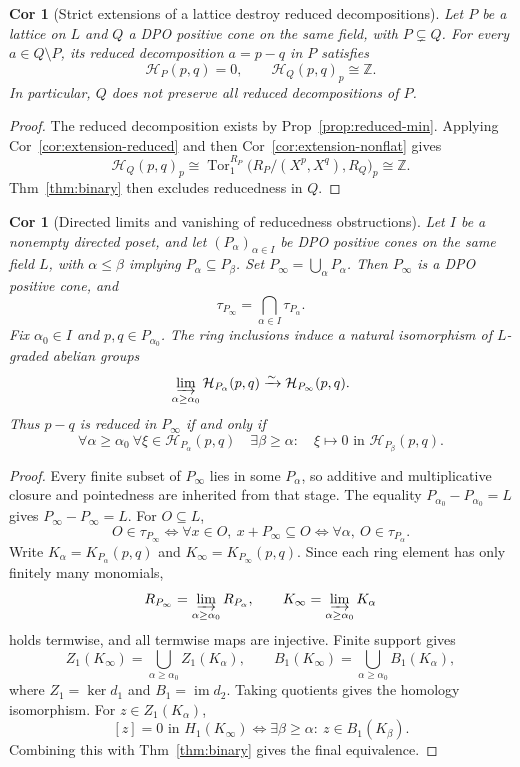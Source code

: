 \documentclass[10pt,letterpaper]{amsart}
\numberwithin{equation}{section}
\newtheorem{cor}[thm]{Cor}
\theoremstyle{definition}
\newcommand{\Z}{\mathbb Z}
\newcommand{\Tor}{\operatorname{Tor}}
\newcommand{\HH}{\mathcal H}
\begin{document}
\begin{cor}[Strict extensions of a lattice destroy reduced decompositions]\label{cor:lattice-extension}
Let $P$ be a lattice on $L$ and $Q$ a DPO positive cone on the same field, with $P\subsetneq Q$.
For every $a\in Q\setminus P$, its reduced decomposition $a=p-q$ in $P$ satisfies
\[
\HH_P(p,q)=0,\qquad\HH_Q(p,q)_p\cong\Z.
\]
In particular, $Q$ does not preserve all reduced decompositions of $P$.
\end{cor}
\begin{proof}
The reduced decomposition exists by Prop~\ref{prop:reduced-min}.
Applying Cor~\ref{cor:extension-reduced} and then Cor~\ref{cor:extension-nonflat} gives
\[
\HH_Q(p,q)_p
\cong\Tor_1^{R_P}\bigl(R_P/(X^p,X^q),R_Q\bigr)_p
\cong\Z.
\]
Thm~\ref{thm:binary} then excludes reducedness in $Q$.
\end{proof}

\begin{cor}[Directed limits and vanishing of reducedness obstructions]\label{cor:cone-limit}
Let $I$ be a nonempty directed poset, and let $(P_\alpha)_{\alpha\in I}$ be DPO positive cones on the same field $L$, with $\alpha\le\beta$ implying $P_\alpha\subseteq P_\beta$. Set $P_\infty=\bigcup_\alpha P_\alpha$. Then $P_\infty$ is a DPO positive cone, and
\[
\tau_{P_\infty}=\bigcap_{\alpha\in I}\tau_{P_\alpha}.
\]
Fix $\alpha_0\in I$ and $p,q\in P_{\alpha_0}$. The ring inclusions induce a natural isomorphism of $L$-graded abelian groups
\[
\varinjlim_{\alpha\ge\alpha_0}\HH_{P_\alpha}(p,q)
\xrightarrow{\sim}\HH_{P_\infty}(p,q).
\]
Thus $p-q$ is reduced in $P_\infty$ if and only if
\[
\forall\alpha\ge\alpha_0\ \forall\xi\in\HH_{P_\alpha}(p,q)\quad
\exists\beta\ge\alpha:\quad
\xi\longmapsto0\text{ in }\HH_{P_\beta}(p,q).
\]
\end{cor}
\begin{proof}
Every finite subset of $P_\infty$ lies in some $P_\alpha$, so additive and multiplicative closure and pointedness are inherited from that stage. The equality $P_{\alpha_0}-P_{\alpha_0}=L$ gives $P_\infty-P_\infty=L$.
For $O\subseteq L$,
\[
O\in\tau_{P_\infty}
\iff\forall x\in O,\ x+P_\infty\subseteq O
\iff\forall\alpha,\ O\in\tau_{P_\alpha}.
\]
Write $K_\alpha=K_{P_\alpha}(p,q)$ and $K_\infty=K_{P_\infty}(p,q)$. Since each ring element has only finitely many monomials,
\[
R_{P_\infty}=\varinjlim_{\alpha\ge\alpha_0}R_{P_\alpha},\qquad
K_\infty=\varinjlim_{\alpha\ge\alpha_0}K_\alpha
\]
holds termwise, and all termwise maps are injective. Finite support gives
\[
Z_1(K_\infty)=\bigcup_{\alpha\ge\alpha_0}Z_1(K_\alpha),\qquad
B_1(K_\infty)=\bigcup_{\alpha\ge\alpha_0}B_1(K_\alpha),
\]
where $Z_1=\ker d_1$ and $B_1=\operatorname{im}d_2$. Taking quotients gives the homology isomorphism. For $z\in Z_1(K_\alpha)$,
\[
[z]=0\text{ in }H_1(K_\infty)
\iff\exists\beta\ge\alpha:\ z\in B_1(K_\beta).
\]
Combining this with Thm~\ref{thm:binary} gives the final equivalence.
\end{proof}
\end{document}
